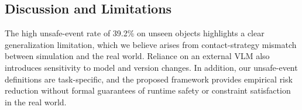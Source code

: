 

\subsection{Discussion and Limitations}
\label{subsec:discussion}

The high unsafe-event rate of 39.2\% on unseen objects highlights a clear
generalization limitation, which we believe arises from contact-strategy
mismatch between simulation and the real world. Reliance on an external VLM
also introduces sensitivity to model and version changes. In addition, our
unsafe-event definitions are task-specific, and the proposed framework provides
empirical risk reduction without formal guarantees of runtime safety or
constraint satisfaction in the real world.
